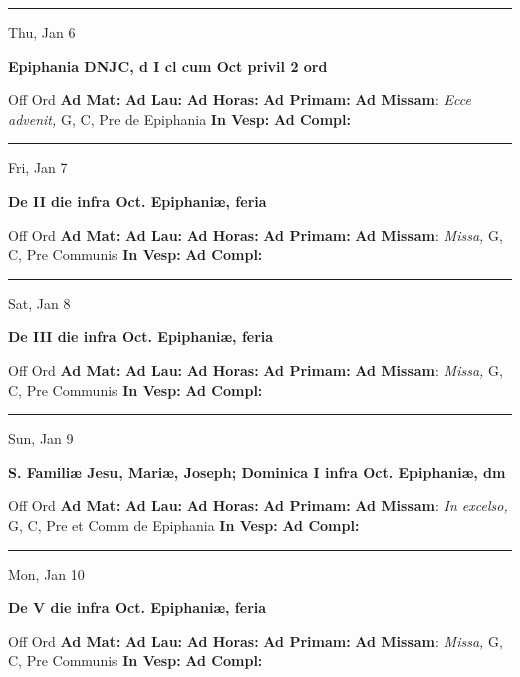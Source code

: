 \documentclass[letterpaper, 10pt]{article}
\begin{document}
\hrule
\begin{center}
Thu, Jan 6
\end{center}\textbf{ \large Epiphania DNJC, \textnormal{\normalsize d I cl cum Oct privil 2 ord}}
\begin{justify}
Off Ord
\textbf{Ad Mat: }
\textbf{Ad Lau: }
\textbf{Ad Horas: }
\textbf{Ad Primam: }
\textbf{Ad Missam}: \textit{Ecce advenit,} G, C, Pre de Epiphania
\textbf{In Vesp: }
\textbf{Ad Compl: }\end{justify}



\hrule
\begin{center}
Fri, Jan 7
\end{center}\textbf{ \large De II die infra Oct. Epiphaniæ, \textnormal{\normalsize feria}}
\begin{justify}
Off Ord
\textbf{Ad Mat: }
\textbf{Ad Lau: }
\textbf{Ad Horas: }
\textbf{Ad Primam: }
\textbf{Ad Missam}: \textit{Missa,} G, C, Pre Communis
\textbf{In Vesp: }
\textbf{Ad Compl: }\end{justify}



\hrule
\begin{center}
Sat, Jan 8
\end{center}\textbf{ \large De III die infra Oct. Epiphaniæ, \textnormal{\normalsize feria}}
\begin{justify}
Off Ord
\textbf{Ad Mat: }
\textbf{Ad Lau: }
\textbf{Ad Horas: }
\textbf{Ad Primam: }
\textbf{Ad Missam}: \textit{Missa,} G, C, Pre Communis
\textbf{In Vesp: }
\textbf{Ad Compl: }\end{justify}



\hrule
\begin{center}
Sun, Jan 9
\end{center}\textbf{ \large S. Familiæ Jesu, Mariæ, Joseph; Dominica I infra Oct. Epiphaniæ, \textnormal{\normalsize dm}}
\begin{justify}
Off Ord
\textbf{Ad Mat: }
\textbf{Ad Lau: }
\textbf{Ad Horas: }
\textbf{Ad Primam: }
\textbf{Ad Missam}: \textit{In excelso,} G, C, Pre et Comm de Epiphania
\textbf{In Vesp: }
\textbf{Ad Compl: }\end{justify}



\hrule
\begin{center}
Mon, Jan 10
\end{center}\textbf{ \large De V die infra Oct. Epiphaniæ, \textnormal{\normalsize feria}}
\begin{justify}
Off Ord
\textbf{Ad Mat: }
\textbf{Ad Lau: }
\textbf{Ad Horas: }
\textbf{Ad Primam: }
\textbf{Ad Missam}: \textit{Missa,} G, C, Pre Communis
\textbf{In Vesp: }
\textbf{Ad Compl: }\end{justify}
\end{document}
